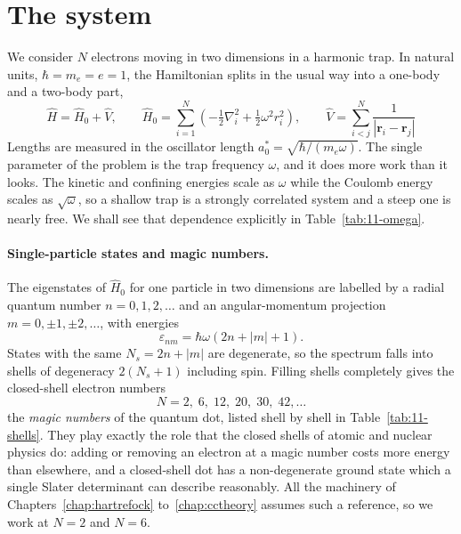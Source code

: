 \section{The system}
\label{sec:qdsystem}

We consider $N$ electrons moving in two dimensions in a harmonic trap.  In
natural units, $\hbar=m_e=e=1$, the Hamiltonian splits in the usual way into a
one-body and a two-body part,
\begin{equation}
  \boxed{\;
  \hat{H} = \hat{H}_0 + \hat{V},
  \qquad
  \hat{H}_0 = \sum_{i=1}^{N}
    \left(-\tfrac12\nabla_i^2 + \tfrac12\omega^2 r_i^2\right),
  \qquad
  \hat{V} = \sum_{i<j}^{N}\frac{1}{|\bm{r}_i-\bm{r}_j|} \;}
  \label{eq:11-hamiltonian}
\end{equation}
Lengths are measured in the oscillator length
$a_0^{*}=\sqrt{\hbar/(m_e\omega)}$.  The single parameter of the problem is
the trap frequency $\omega$, and it does more work than it looks.  The kinetic
and confining energies scale as $\omega$ while the Coulomb energy scales as
$\sqrt{\omega}$, so a shallow trap is a strongly correlated system and a steep
one is nearly free.  We shall see that dependence explicitly in
Table~\ref{tab:11-omega}.

\paragraph{Single-particle states and magic numbers.}
The eigenstates of $\hat{H}_0$ for one particle in two dimensions are labelled
by a radial quantum number $n=0,1,2,\dots$ and an angular-momentum projection
$m=0,\pm1,\pm2,\dots$, with energies
\begin{equation}
  \varepsilon_{nm} = \hbar\omega\left(2n+|m|+1\right).
  \label{eq:11-spenergies}
\end{equation}
States with the same $N_s=2n+|m|$ are degenerate, so the spectrum falls into
shells of degeneracy $2(N_s+1)$ including spin.  Filling shells completely
gives the closed-shell electron numbers
\begin{equation}
  N = 2,\;6,\;12,\;20,\;30,\;42,\dots
  \label{eq:11-magic}
\end{equation}
the \emph{magic numbers} of the quantum dot, listed shell by shell in
Table~\ref{tab:11-shells}.  They play exactly the role that the closed shells
of atomic and nuclear physics do: adding or removing an electron at a magic
number costs more energy than elsewhere, and a closed-shell dot has a
non-degenerate ground state which a single Slater determinant can describe
reasonably.  All the machinery of Chapters~\ref{chap:hartrefock}
to~\ref{chap:cctheory} assumes such a reference, so we work at $N=2$ and
$N=6$.

